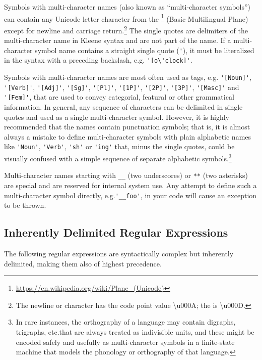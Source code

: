 \vspace{.5cm}

\noindent
Symbols with multi-character names (also known as ``multi-character symbols'') can contain any
Unicode letter character from the
\footnote{\url{https://en.wikipedia.org/wiki/Plane_(Unicode)}} (Basic Multilingual Plane) except for newline and
carriage return.\footnote{The newline or  character has the code
point value \textbackslash{}u000A; the  is \textbackslash{}u000D.}  The
single quotes are delimiters of the multi-character 
name in Kleene syntax and are not part of the name.  If a
multi-character symbol name contains a straight single quote
(\verb!'!), it must be literalized in the syntax with a preceding backslash, e.g.\@
\verb!'[o\'clock]'!.

Symbols with multi-character names are most often used as tags, e.g.\@
\verb!'[Noun]'!, \verb!'[Verb]'!, \verb!'[Adj]'!, \verb!'[Sg]'!,
\verb!'[Pl]'!, \verb!'[1P]'!, \verb!'[2P]'!, \verb!'[3P]'!,
\verb!'[Masc]'! and \verb!'[Fem]'!, that are used to convey categorial,
featural or other grammatical information.  In general, any sequence of
 characters can be delimited in single quotes and used as a
single multi-character symbol.  However, it is highly recommended that
the names contain punctuation symbols; that is, it is almost always a
mistake to define multi-character symbols with plain alphabetic names
like \verb!'Noun'!, \verb!'Verb'!, \verb!'sh'! or \verb!'ing'! that, 
minus the single quotes, could be visually confused with a simple
sequence of separate alphabetic symbols.\footnote{In rare instances, the
orthography of a language may contain digraphs, trigraphs, etc.\@ that
are always treated as indivisible units, and these might be encoded
safely and usefully as multi-character symbols in a finite-state machine
that models the phonology or orthography of that language.}

Multi-character names starting with \verb!__! (two underscores) or
\verb!**! (two asterisks) are special and are reserved for internal
system use.  Any attempt to define such a multi-character symbol
directly, e.g.\@ \verb!'__foo'!, in your code will cause an exception to be
thrown.

\subsection{Inherently Delimited Regular Expressions}

The following regular expressions are syntactically complex but
inherently delimited, making them also of highest precedence.

